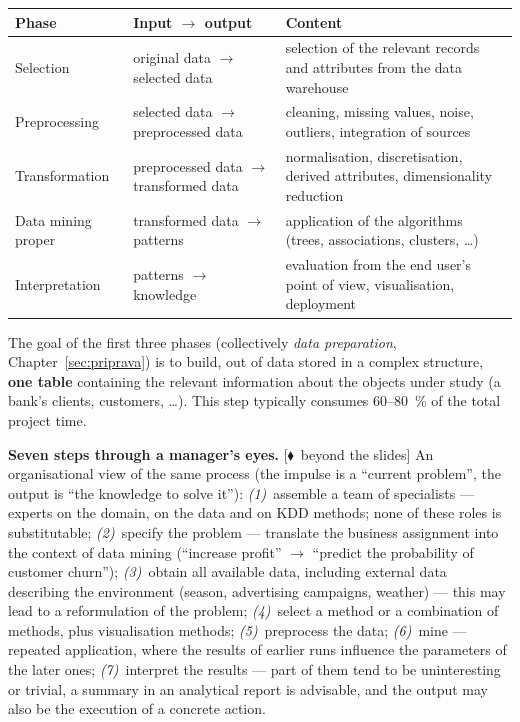 \documentclass[11pt,a4paper]{article}
\theoremstyle{definition}
\providecommand{\uv}[1]{``#1''}
\newcommand{\mimo}{\textcolor{markcol}{\textsf{\footnotesize[$\blacklozenge$~beyond the slides]}}}
\begin{document}
\begin{center}
\small
\begin{tabular}{@{}p{3.3cm}p{4.2cm}p{7.6cm}@{}}
\toprule
\textbf{Phase} & \textbf{Input $\to$ output} & \textbf{Content} \\
\midrule
Selection & original data $\to$ selected data & selection of the relevant records and
  attributes from the data warehouse \\
Preprocessing & selected data $\to$ preprocessed data & cleaning, missing values, noise,
  outliers, integration of sources \\
Transformation & preprocessed data $\to$ transformed data & normalisation, discretisation,
  derived attributes, dimensionality reduction \\
Data mining proper & transformed data $\to$ patterns & application of the algorithms (trees,
  associations, clusters, \dots) \\
Interpretation & patterns $\to$ knowledge & evaluation from the end user's point of view,
  visualisation, deployment \\
\bottomrule
\end{tabular}
\end{center}

The goal of the first three phases (collectively \emph{data preparation},
Chapter~\ref{sec:priprava}) is to build, out of data stored in a complex structure, \textbf{one
table} containing the relevant information about the objects under study (a bank's clients,
customers, \dots). This step typically consumes 60--80~\% of the total project time.

\textbf{Seven steps through a manager's eyes.} \mimo{} An organisational view of the same
process (the impulse is a \uv{current problem}, the output is \uv{the knowledge to solve it}):
\emph{(1)}~assemble a team of specialists --- experts on the domain, on the data and on KDD
methods; none of these roles is substitutable; \emph{(2)}~specify the problem --- translate the
business assignment into the context of data mining (\uv{increase profit} $\to$
\uv{predict the probability of customer churn}); \emph{(3)}~obtain all available data, including
external data describing the environment (season, advertising campaigns, weather) --- this may
lead to a reformulation of the problem; \emph{(4)}~select a method or a combination of methods,
plus visualisation methods; \emph{(5)}~preprocess the data; \emph{(6)}~mine --- repeated
application, where the results of earlier runs influence the parameters of the later ones;
\emph{(7)}~interpret the results --- part of them tend to be uninteresting or trivial, a summary
in an analytical report is advisable, and the output may also be the execution of a concrete
action.
\end{document}
